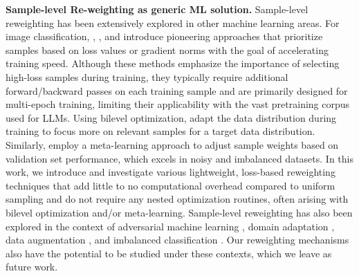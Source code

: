 \textbf{Sample-level Re-weighting as generic ML solution.} 
Sample-level reweighting has been extensively explored in other machine learning areas. For image classification, \cite{loshchilov2015online}, \cite{jiang2019accelerating}, and \cite{katharopoulos2018not} introduce pioneering approaches that prioritize samples based on loss values or gradient norms with the goal of accelerating training speed. Although these methods emphasize the importance of selecting high-loss samples during training, they typically require additional forward/backward passes on each training sample and are primarily designed for multi-epoch training, limiting their applicability with the vast pretraining corpus used for LLMs. Using bilevel optimization, \citet{grangier2023adaptive} adapt the data distribution during training to focus more on relevant samples for a target data distribution. Similarly, \citet{ren2018learning} employ a meta-learning approach to adjust sample weights based on validation set performance, which excels in noisy and imbalanced datasets. In this work, we introduce and investigate various lightweight, loss-based reweighting techniques that add little to no computational overhead compared to uniform sampling and do not require any nested optimization routines, often arising with bilevel optimization and/or meta-learning.
Sample-level reweighting has also been explored in the context of adversarial machine learning \citep{zhang2020geometry,liu2021probabilistic,zeng2021adversarial,sow2023doubly}, domain adaptation \citep{jiang2007instance,fang2020rethinking}, data augmentation \citep{yi2021reweighting}, and imbalanced classification \citep{qi2021online,ren2018learning}. Our reweighting mechanisms also have the potential to be studied under these contexts, which we leave as future work.